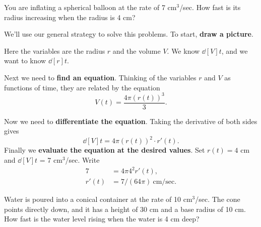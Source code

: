 \begin{example}
You are inflating a spherical balloon at the rate of 7 cm${}^3$/sec.  How
fast is its radius increasing when the radius is 4 cm?
\end{example}

\begin{solution}
We'll use our general strategy to solve this problems. To start,
\textbf{draw a picture}.


Here the variables are the radius $r$ and the volume $V$.  We know
$\dd[V]{t}$, and we want to know $\dd[r]{t}$. 


Next we need to \textbf{find an equation}.  Thinking of the variables
$r$ and $V$ as functions of time, they are related by the equation
\[
V(t)=\frac{4\pi (r(t))^3}{3}.
\]

Now we need to \textbf{differentiate the equation}.  Taking the
derivative of both sides gives 
\[
\dd[V]{t}=4\pi (r(t))^2\cdot r'(t).
\]  
Finally we \textbf{evaluate the equation at the desired values}. Set
$r(t)= 4$ cm and $\dd[V]{t}$ = 7 cm$^3$/sec. Write 
\begin{align*}
7 &=4\pi 4^2r'(t),\\
r'(t) &=7/(64\pi)~\text{cm/sec}.
\end{align*}
\end{solution}

\begin{example} Water is poured into a conical container at the rate of 10
cm${}^3$/sec.  The cone points directly down, and it has a height of
30 cm and a base radius of 10 cm.  How fast is the water level rising
when the water is 4 cm deep?
\end{example}

